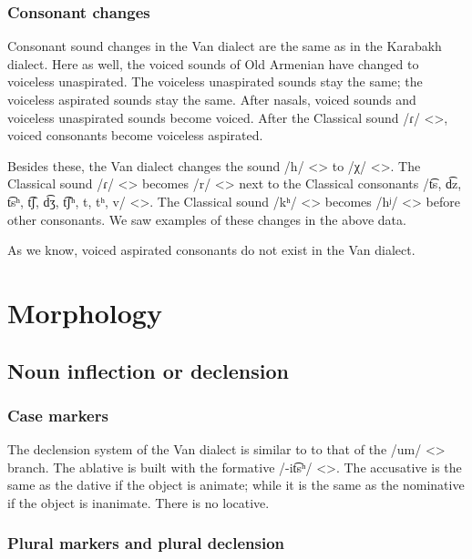 \subsubsection{Consonant changes}

Consonant sound changes in the Van dialect are the same as in the Karabakh dialect. Here as well, the voiced sounds of Old Armenian have changed to voiceless unaspirated. The voiceless unaspirated sounds stay the same; the voiceless aspirated sounds stay the same. After nasals, voiced sounds and voiceless unaspirated sounds become voiced. After the Classical sound /ɾ/ <>, voiced consonants become voiceless aspirated. 

Besides these, the Van dialect changes the sound /h/ <> to /χ/ <>. The Classical sound /ɾ/ <>   becomes /r/ <> next to the Classical consonants    /t͡s, d͡z, t͡sʰ, t͡ʃ, d͡ʒ, t͡ʃʰ, t, tʰ, v/ <>. The Classical sound /kʰ/ <> becomes /hʲ/ <> before other consonants. We saw examples of these changes in the above data. 


\begin{adjarianpage}\label{page:143}\end{adjarianpage}%

As we know, voiced aspirated consonants do not exist in the Van dialect. 

\section{Morphology}
\subsection{Noun inflection or declension}

\subsubsection{Case markers}
The declension system of the Van dialect is similar to to that of the /um/ <> branch. The ablative is built with the formative /-it͡sʰ/ <>. The accusative is the same as the dative if the object is animate; while it is the same as the nominative if the object is inanimate. There is no locative. 

\subsubsection{Plural markers and plural declension}

